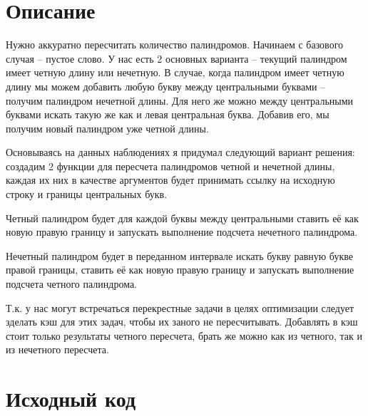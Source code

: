 \section{Описание}
Нужно аккуратно пересчитать количество палиндромов. Начинаем с базового случая -- пустое слово. У нас есть 2 основных варианта -- текущий палиндром имеет четную длину или нечетную. В случае, когда палиндром имеет четную длину мы можем добавить любую букву между центральными буквами -- получим палиндром нечетной длины. Для него же можно между центральными буквами искать такую же как и левая центральная буква. Добавив его, мы получим новый палиндром уже четной длины.

Основываясь на данных наблюдениях я придумал следующий вариант решения: создадим 2 функции для пересчета палиндромов четной и нечетной длины, каждая их них в качестве аргументов будет принимать ссылку на исходную строку и границы центральных букв.

Четный палиндром будет для каждой буквы между центральными ставить её как новую правую границу и запускать выполнение подсчета нечетного палиндрома.

Нечетный палиндром будет в переданном интервале искать букву равную букве правой границы, ставить её как новую правую границу и запускать выполнение подсчета четного палиндрома.

Т.к. у нас могут встречаться перекрестные задачи в целях оптимизации следует зделать кэш для этих задач, чтобы их заного не пересчитывать. Добавлять в кэш стоит только результаты четного пересчета, брать же можно как из четного, так и из нечетного пересчета.

\pagebreak

\section{Исходный код}


